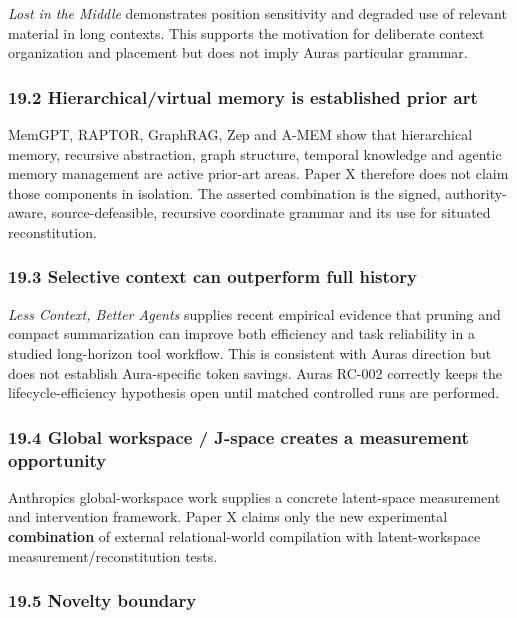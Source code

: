 \documentclass[
  10pt,
  letterpaper,
]{article}
\begin{document}
\emph{Lost in the Middle} demonstrates position sensitivity and degraded
use of relevant material in long contexts. This supports the motivation
for deliberate context organization and placement but does not imply
Aura\textquotesingle s particular grammar.

\subsubsection{19.2 Hierarchical/virtual memory is established prior
art}\label{192-hierarchicalvirtual-memory-is-established-prior-art}

MemGPT, RAPTOR, GraphRAG, Zep and A-MEM show that hierarchical memory,
recursive abstraction, graph structure, temporal knowledge and agentic
memory management are active prior-art areas. Paper X therefore does not
claim those components in isolation. The asserted combination is the
signed, authority-aware, source-defeasible, recursive coordinate grammar
and its use for situated reconstitution.

\subsubsection{19.3 Selective context can outperform full
history}\label{193-selective-context-can-outperform-full-history}

\emph{Less Context, Better Agents} supplies recent empirical evidence
that pruning and compact summarization can improve both efficiency and
task reliability in a studied long-horizon tool workflow. This is
consistent with Aura\textquotesingle s direction but does not establish
Aura-specific token savings. Aura\textquotesingle s RC-002 correctly
keeps the lifecycle-efficiency hypothesis open until matched controlled
runs are performed.

\subsubsection{19.4 Global workspace / J-space creates a measurement
opportunity}\label{194-global-workspace--j-space-creates-a-measurement-opportunity}

Anthropic\textquotesingle s global-workspace work supplies a concrete
latent-space measurement and intervention framework. Paper X claims only
the new experimental \textbf{combination} of external relational-world
compilation with latent-workspace measurement/reconstitution tests.

\subsubsection{19.5 Novelty boundary}\label{195-novelty-boundary}
\end{document}
